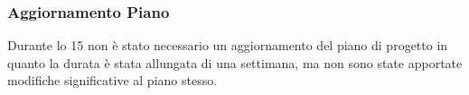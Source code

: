 \subsubsection{Aggiornamento Piano}
\label{sec:aggiornamento_piano_sprint15}
Durante lo  15 non è stato necessario un aggiornamento del piano di progetto in quanto la durata è stata allungata di una settimana, ma non sono state apportate modifiche significative al piano stesso.